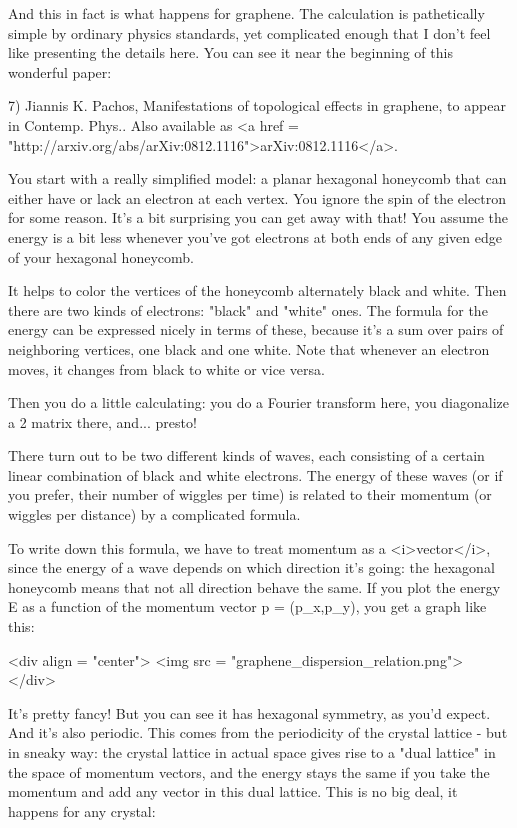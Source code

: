 And this in fact is what happens for graphene.  The calculation is
pathetically simple by ordinary physics standards, yet complicated
enough that I don't feel like presenting the details here.  You 
can see it near the beginning of this wonderful paper:

7) Jiannis K. Pachos, Manifestations of topological effects in
graphene, to appear in Contemp. Phys..  Also available as <a href =
"http://arxiv.org/abs/arXiv:0812.1116">arXiv:0812.1116</a>.

You start with a really simplified model: a planar hexagonal honeycomb
that can either have or lack an electron at each vertex.  You ignore 
the spin of the electron for some reason.  It's a bit surprising you 
can get away with that!  You assume the energy is a bit less whenever 
you've got electrons at both ends of any given edge of your hexagonal 
honeycomb.  

It helps to color the vertices of the honeycomb alternately black and
white.  Then there are two kinds of electrons: "black" and
"white" ones.  The formula for the energy can be expressed
nicely in terms of these, because it's a sum over pairs of neighboring
vertices, one black and one white.  Note that whenever an electron
moves, it changes from black to white or vice versa.

Then you do a little calculating: you do a Fourier transform here,
you diagonalize a 2 matrix there, and... presto!

There turn out to be two different kinds of waves, each consisting of
a certain linear combination of black and white electrons.  The energy of
these waves (or if you prefer, their number of wiggles per time) is
related to their momentum (or wiggles per distance) by a complicated
formula.

To write down this formula, we have to treat momentum as a
<i>vector</i>, since the energy of a wave depends on which direction
it's going: the hexagonal honeycomb means that not all direction
behave the same.  If you plot the energy E as a function of the
momentum vector p = (p_{x},p_{y}), you get a graph
like this:

<div align = "center">
<img src = "graphene_dispersion_relation.png">
</div>

It's pretty fancy!  But you can see it has hexagonal symmetry, as you'd
expect.  And it's also periodic.  This comes from the periodicity 
of the crystal lattice - but in sneaky way: the crystal lattice in
actual space gives rise to a "dual lattice" in the space of momentum
vectors, and the energy stays the same if you take the momentum and
add any vector in this dual lattice.  This is no big deal, it happens 
for any crystal:

